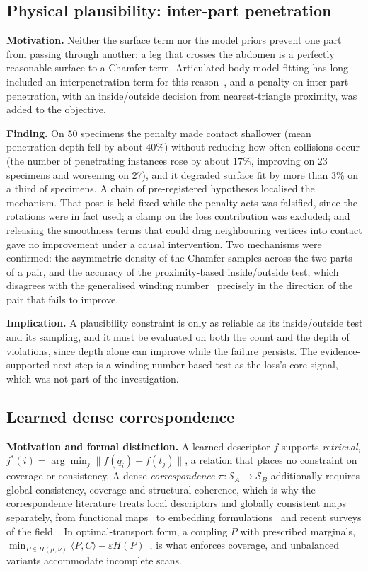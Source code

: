 \subsection{Physical plausibility: inter-part penetration}
\label{sec:penetration}

\textbf{Motivation.} Neither the surface term nor the model priors prevent one part
from passing through another: a leg that crosses the abdomen is a perfectly
reasonable surface to a Chamfer term. Articulated body-model fitting has long
included an interpenetration term for this reason~\cite{bogo}, and a penalty on
inter-part penetration, with an inside/outside decision from nearest-triangle
proximity, was added to the objective.

\textbf{Finding.} On 50 specimens the penalty made contact shallower (mean
penetration depth fell by about $40\%$) without reducing how often collisions
occur (the number of penetrating instances rose by about $17\%$, improving on 23
specimens and worsening on 27), and it degraded surface fit by more than $3\%$ on a
third of specimens. A chain of pre-registered hypotheses localised the mechanism.
That pose is held fixed while the penalty acts was falsified, since the rotations
were in fact used; a clamp on the loss contribution was excluded; and releasing the
smoothness terms that could drag neighbouring vertices into contact gave no
improvement under a causal intervention. Two mechanisms were confirmed: the
asymmetric density of the Chamfer samples across the two parts of a pair, and the
accuracy of the proximity-based inside/outside test, which disagrees with the
generalised winding number~\cite{jacobson} precisely in the direction of the pair
that fails to improve.

\textbf{Implication.} A plausibility constraint is only as reliable as its
inside/outside test and its sampling, and it must be evaluated on both the count and
the depth of violations, since depth alone can improve while the failure persists.
The evidence-supported next step is a winding-number-based test as the loss's core
signal, which was not part of the investigation.

\subsection{Learned dense correspondence}
\label{sec:learned-correspondence}

\textbf{Motivation and formal distinction.} A learned descriptor $f$ supports
\emph{retrieval}, $j^\ast(i)=\arg\min_j\|f(q_i)-f(t_j)\|$, a relation that places no
constraint on coverage or consistency. A dense \emph{correspondence}
$\pi:\mathcal S_A\rightarrow\mathcal S_B$ additionally requires global consistency,
coverage and structural coherence, which is why the correspondence literature
treats local descriptors and globally consistent maps separately, from functional
maps~\cite{fmaps} to embedding formulations~\cite{cse,haugaard} and recent
surveys of the field~\cite{survey}. In optimal-transport form, a coupling $P$ with
prescribed marginals,
$\min_{P\in\Pi(\mu,\nu)}\langle P,C\rangle-\varepsilon H(P)$~\cite{ot}, is what
enforces coverage, and unbalanced variants accommodate incomplete scans.

